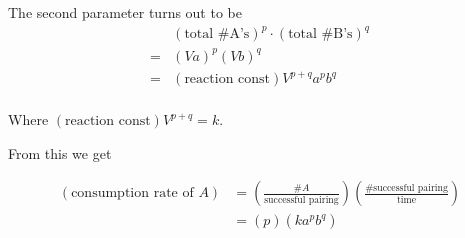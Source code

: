 \documentclass[12pt]{article}
\begin{document}
The second parameter turns out to be
\begin{equation}
  \begin{aligned}
    &{\left(\text{total \# A's}\right)}^p \cdot {\left(\text{total \# B's}\right)}^q \\
    = &{(Va)}^p{(Vb)}^q \\
    = & \left(\text{reaction const}\right)V^{p+q} a^p b^q \\
  \end{aligned}
\end{equation}

Where $\left(\text{reaction const}\right)V^{p+q} = k$.

From this we get

\begin{equation}
  \begin{aligned}
    \left(\text{consumption rate of }A\right) &= \left(\frac{\text{\# }A}{\text{successful pairing}}\right)
    \left(\frac{\text{\# successful pairing}}{\text{time}}\right) \\
    &= (p) (ka^{p} b^q) \\
  \end{aligned}
\end{equation}
\end{document}
